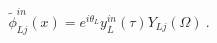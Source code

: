 \begin{equation}
\tilde{\phi}_{Lj}^{in}(x)=e^{i\theta_L}y^{in}_L(\tau)
Y_{Lj}(\Omega) \ .
\end{equation}

